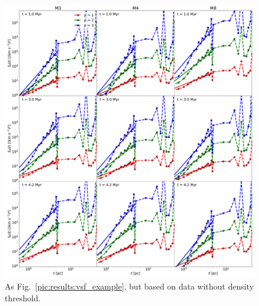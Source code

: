  	
\begin{figure}
    \centering
    \includegraphics[width=\textwidth]{app_examples_woutthres_s_l.pdf}
    \caption{
        As Fig.~\ref{pic:results:vsf_example}, but based on data without density threshold.
    }
    \label{pic:appInertial:examples_without_threshold_s_vs_l}
\end{figure}
 	
